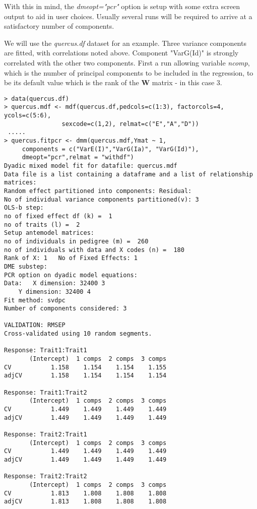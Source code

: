 \documentclass[titlepage]{article}  %
\begin{document}
With this in mind, the {\em dmeopt="pcr"} option is setup with some extra screen output to aid in user choices. Usually several runs will be required to arrive at a satisfactory number of components.

We will use the {\em quercus.df} dataset for an example. Three variance components are fitted, with correlations noted above. Component "VarG(Id)" is strongly correlated with the other two components. First a run allowing variable {\em ncomp}, which is the number of principal components to be included in the regression, to be its default value which is the rank of the $\bm{W}$ matrix - in this case $3$.

\begin{verbatim}
> data(quercus.df)
> quercus.mdf <- mdf(quercus.df,pedcols=c(1:3), factorcols=4, ycols=c(5:6),
                sexcode=c(1,2), relmat=c("E","A","D"))
 .....
> quercus.fitpcr <- dmm(quercus.mdf,Ymat ~ 1,
     components = c("VarE(I)","VarG(Ia)", "VarG(Id)"),
     dmeopt="pcr",relmat = "withdf")
Dyadic mixed model fit for datafile: quercus.mdf  
Data file is a list containing a dataframe and a list of relationship matrices:
Random effect partitioned into components: Residual:
No of individual variance components partitioned(v): 3 
OLS-b step:
no of fixed effect df (k) =  1 
no of traits (l) =  2 
Setup antemodel matrices:
no of individuals in pedigree (m) =  260 
no of individuals with data and X codes (n) =  180 
Rank of X: 1   No of Fixed Effects: 1 
DME substep:
PCR option on dyadic model equations:
Data: 	X dimension: 32400 3 
	Y dimension: 32400 4
Fit method: svdpc
Number of components considered: 3

VALIDATION: RMSEP
Cross-validated using 10 random segments.

Response: Trait1:Trait1 
       (Intercept)  1 comps  2 comps  3 comps
CV           1.158    1.154    1.154    1.155
adjCV        1.158    1.154    1.154    1.154

Response: Trait1:Trait2 
       (Intercept)  1 comps  2 comps  3 comps
CV           1.449    1.449    1.449    1.449
adjCV        1.449    1.449    1.449    1.449

Response: Trait2:Trait1 
       (Intercept)  1 comps  2 comps  3 comps
CV           1.449    1.449    1.449    1.449
adjCV        1.449    1.449    1.449    1.449

Response: Trait2:Trait2 
       (Intercept)  1 comps  2 comps  3 comps
CV           1.813    1.808    1.808    1.808
adjCV        1.813    1.808    1.808    1.808


\end{verbatim}
\end{document}
